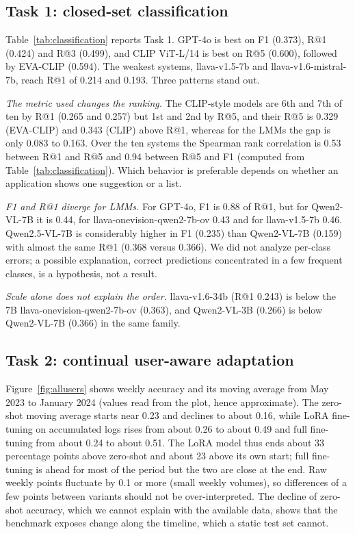 \documentclass[sigconf, nonacm]{acmart}
\begin{document}
\subsection{Task 1: closed-set classification}

Table~\ref{tab:classification} reports Task 1. GPT-4o is best on F1 (0.373), R@1 (0.424) and R@3 (0.499), and CLIP ViT-L/14 is best on R@5 (0.600), followed by EVA-CLIP (0.594). The weakest systems, llava-v1.5-7b and llava-v1.6-mistral-7b, reach R@1 of 0.214 and 0.193. Three patterns stand out.

\emph{The metric used changes the ranking.} The CLIP-style models are 6th and 7th of ten by R@1 (0.265 and 0.257) but 1st and 2nd by R@5, and their R@5 is 0.329 (EVA-CLIP) and 0.343 (CLIP) above R@1, whereas for the LMMs the gap is only 0.083 to 0.163. Over the ten systems the Spearman rank correlation is 0.53 between R@1 and R@5 and 0.94 between R@5 and F1 (computed from Table~\ref{tab:classification}). Which behavior is preferable depends on whether an application shows one suggestion or a list.

\emph{F1 and R@1 diverge for LMMs.} For GPT-4o, F1 is 0.88 of R@1, but for Qwen2-VL-7B it is 0.44, for llava-onevision-qwen2-7b-ov 0.43 and for llava-v1.5-7b 0.46. Qwen2.5-VL-7B is considerably higher in F1 (0.235) than Qwen2-VL-7B (0.159) with almost the same R@1 (0.368 versus 0.366). We did not analyze per-class errors; a possible explanation, correct predictions concentrated in a few frequent classes, is a hypothesis, not a result.

\emph{Scale alone does not explain the order.} llava-v1.6-34b (R@1 0.243) is below the 7B llava-onevision-qwen2-7b-ov (0.363), and Qwen2-VL-3B (0.266) is below Qwen2-VL-7B (0.366) in the same family.

\subsection{Task 2: continual user-aware adaptation}

Figure~\ref{fig:allusers} shows weekly accuracy and its moving average from May 2023 to January 2024 (values read from the plot, hence approximate). The zero-shot moving average starts near 0.23 and declines to about 0.16, while LoRA fine-tuning on accumulated logs rises from about 0.26 to about 0.49 and full fine-tuning from about 0.24 to about 0.51. The LoRA model thus ends about 33 percentage points above zero-shot and about 23 above its own start; full fine-tuning is ahead for most of the period but the two are close at the end. Raw weekly points fluctuate by 0.1 or more (small weekly volumes), so differences of a few points between variants should not be over-interpreted. The decline of zero-shot accuracy, which we cannot explain with the available data, shows that the benchmark exposes change along the timeline, which a static test set cannot.
\end{document}
